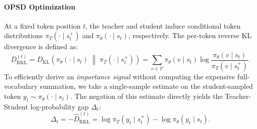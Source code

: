 \documentclass{article} %
\begin{document}
\paragraph{OPSD Optimization}

At a fixed token position $t$, the teacher and student induce conditional token distributions $\pi_T(\cdot \mid s_t^{+})$ and $\pi_{\theta}(\cdot \mid s_t)$, respectively. The per-token reverse KL divergence is defined as:
$$
D_{\mathrm{RKL}}^{(t)} = D_{\mathrm{KL}}\!\left( \pi_{\theta}(\cdot \mid s_t) \;\middle\|\; \pi_T(\cdot \mid s_t^{+}) \right) = \sum_{v \in \mathcal{V}} \pi_{\theta}(v \mid s_t) \log \frac{\pi_{\theta}(v \mid s_t)}{\pi_T(v \mid s_t^{+})}.
$$
To efficiently derive an \emph{importance signal} without computing the expensive full-vocabulary summation, we take a single-sample estimate on the student-sampled token $y_t \sim \pi_{\theta}(\cdot \mid s_t)$. The negation of this estimate directly yields the Teacher-Student log-probability gap $\Delta_t$:
$$
\Delta_t = -\widehat{D}_{\mathrm{RKL}}^{(t)} = \log \pi_T(y_t \mid s_t^{+}) - \log \pi_{\theta}(y_t \mid s_t).
$$
\end{document}
